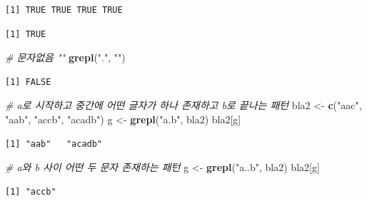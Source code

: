 \documentclass[
  11pt,
]{krantz}
\newenvironment{Shaded}{\begin{snugshade}}{\end{snugshade}}
\newcommand{\CommentTok}[1]{\textcolor[rgb]{0.37,0.37,0.37}{\textit{#1}}}
\newcommand{\KeywordTok}[1]{\textcolor[rgb]{0.27,0.27,0.27}{\textbf{#1}}}
\newcommand{\NormalTok}[1]{#1}
\newcommand{\StringTok}[1]{\textcolor[rgb]{0.5,0.5,0.5}{#1}}
\begin{document}
\begin{verbatim}
[1] TRUE TRUE TRUE TRUE
\end{verbatim}

\begin{Shaded}
\end{Shaded}

\begin{verbatim}
[1] TRUE
\end{verbatim}

\begin{Shaded}
\begin{Highlighting}[]
\CommentTok{# 문자없음 ""}
\KeywordTok{grepl}\NormalTok{(}\StringTok{"."}\NormalTok{, }\StringTok{""}\NormalTok{)}
\end{Highlighting}
\end{Shaded}

\begin{verbatim}
[1] FALSE
\end{verbatim}

\begin{Shaded}
\begin{Highlighting}[]
\CommentTok{# a로 시작하고 중간에 어떤 글자가 하나 존재하고 b로 끝나는 패턴 }
\NormalTok{bla2 <-}\StringTok{ }\KeywordTok{c}\NormalTok{(}\StringTok{"aac"}\NormalTok{, }\StringTok{"aab"}\NormalTok{, }\StringTok{"accb"}\NormalTok{, }\StringTok{"acadb"}\NormalTok{)}
\NormalTok{g <-}\StringTok{ }\KeywordTok{grepl}\NormalTok{(}\StringTok{"a.b"}\NormalTok{, bla2)}
\NormalTok{bla2[g]}
\end{Highlighting}
\end{Shaded}

\begin{verbatim}
[1] "aab"   "acadb"
\end{verbatim}

\begin{Shaded}
\begin{Highlighting}[]
\CommentTok{# a와 b 사이 어떤 두 문자 존재하는 패턴}
\NormalTok{g <-}\StringTok{ }\KeywordTok{grepl}\NormalTok{(}\StringTok{"a..b"}\NormalTok{, bla2)}
\NormalTok{bla2[g]}
\end{Highlighting}
\end{Shaded}

\begin{verbatim}
[1] "accb"
\end{verbatim}
\end{document}
